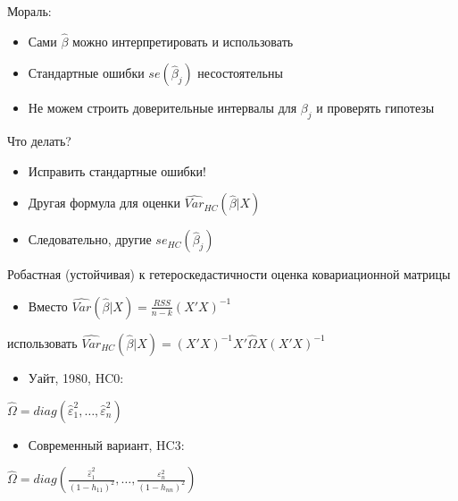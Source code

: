 \documentclass[ignorenonframetext,]{beamer}
\begin{document}
\begin{frame}{Мораль:}

\begin{itemize}
\item
  Сами \(\hat{\beta}\) можно интерпретировать и использовать
\item
  Стандартные ошибки \(se(\hat{\beta}_j)\) несостоятельны
\item
  Не можем строить доверительные интервалы для \(\beta_j\) и проверять
  гипотезы
\end{itemize}

\end{frame}

\begin{frame}{Что делать?}

\begin{itemize}
\item
  Исправить стандартные ошибки!
\item
  Другая формула для оценки \(\widehat{Var}_{HC}(\hat{\beta}|X)\)
\item
  Следовательно, другие \(se_{HC}(\hat{\beta}_j)\)
\end{itemize}

\end{frame}

\begin{frame}{Робастная (устойчивая) к гетероскедастичности оценка
ковариационной матрицы}

\begin{itemize}
\itemsep1pt\parskip0pt
\item
  Вместо \(\widehat{Var}(\hat{\beta}|X)=\frac{RSS}{n-k}(X'X)^{-1}\)
\end{itemize}

использовать
\(\widehat{Var}_{HC}(\hat{\beta}|X)=(X'X)^{-1}X'\hat{\Omega}X(X'X)^{-1}\)

\begin{itemize}
\itemsep1pt\parskip0pt
\item
  Уайт, 1980, HC0:
\end{itemize}

\(\hat{\Omega}=diag( \hat{\varepsilon}_1^2, \ldots, \hat{\varepsilon}_n^2 )\)

\begin{itemize}
\itemsep1pt\parskip0pt
\item
  Современный вариант, HC3:
\end{itemize}

\(\hat{\Omega}=diag \left( \frac{\hat{\varepsilon}_1^2}{(1-h_{11})^2}, \ldots, \frac{\varepsilon_n^2}{(1-h_{nn})^2} \right)\)

\end{frame}
\end{document}
